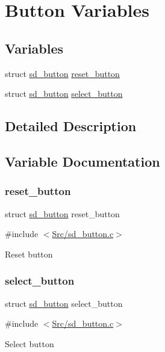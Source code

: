 \hypertarget{group___s_d___button___variables}{}\section{Button Variables}
\label{group___s_d___button___variables}
\subsection*{Variables}
\begin{DoxyCompactItemize}
\item 
struct \mbox{\hyperlink{structsd__button}{sd\+\_\+button}} \mbox{\hyperlink{group___s_d___button___variables_ga39ada2536c7b570ccaf03e6847b14490}{reset\+\_\+button}}
\item 
struct \mbox{\hyperlink{structsd__button}{sd\+\_\+button}} \mbox{\hyperlink{group___s_d___button___variables_gacffe7a9e7d7f2e6bbd6650de1dc8a9db}{select\+\_\+button}}
\end{DoxyCompactItemize}


\subsection{Detailed Description}


\subsection{Variable Documentation}
\mbox{\label{group___s_d___button___variables_ga39ada2536c7b570ccaf03e6847b14490}} 
\subsubsection{\texorpdfstring{reset\+\_\+button}{reset\_button}}
{\footnotesize\ttfamily struct \mbox{\hyperlink{structsd__button}{sd\+\_\+button}} reset\+\_\+button}



{\ttfamily \#include $<$\mbox{\hyperlink{sd__button_8c}{Src/sd\+\_\+button.\+c}}$>$}

Reset button \mbox{\label{group___s_d___button___variables_gacffe7a9e7d7f2e6bbd6650de1dc8a9db}} 
\subsubsection{\texorpdfstring{select\+\_\+button}{select\_button}}
{\footnotesize\ttfamily struct \mbox{\hyperlink{structsd__button}{sd\+\_\+button}} select\+\_\+button}



{\ttfamily \#include $<$\mbox{\hyperlink{sd__button_8c}{Src/sd\+\_\+button.\+c}}$>$}

Select button 